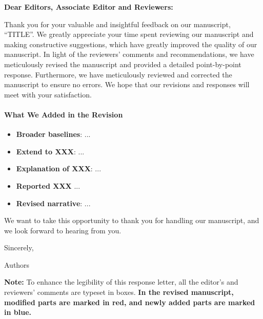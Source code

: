 \thispagestyle{empty}
\clearpage
{}
{}

\noindent \textbf{Dear Editors, Associate Editor and Reviewers:}

Thank you for your valuable and insightful feedback on our manuscript, ``TITLE''. We greatly appreciate your time spent reviewing our manuscript and making constructive suggestions, which have greatly improved the quality of our manuscript. In light of the reviewers' comments and recommendations, we have meticulously revised the manuscript and provided a detailed point-by-point response. Furthermore, we have meticulously reviewed and corrected the manuscript to ensure no errors. We hope that our revisions and responses will meet with your satisfaction.


\paragraph{What We Added in the Revision}

\begin{itemize}
    \item \textbf{Broader baselines}: ...
    
    \item \textbf{Extend to XXX}: ...

    \item \textbf{Explanation of XXX}: ...

    \item \textbf{Reported XXX} ...

    \item \textbf{Revised narrative}: ...
\end{itemize}

We want to take this opportunity to thank you for handling our manuscript, and we look forward to hearing from you.

\vspace{8em}

\noindent Sincerely,

\noindent Authors

\vfill
\textbf{Note:} To enhance the legibility of this response letter, all the editor's and reviewers' comments are typeset in boxes. \textbf{In the revised manuscript, modified parts are marked in red, and newly added parts are marked in blue.}